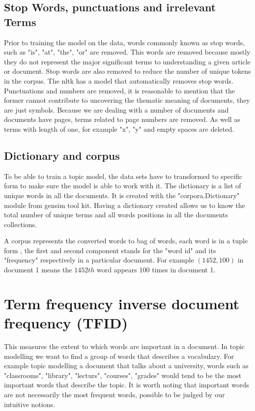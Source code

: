 \subsection{Stop Words, punctuations  and irrelevant Terms}
\begin{flushleft}
Prior to training the model on the data, words commonly known as stop words, such as "is", "at", "the", "or" are removed. This words are removed because mostly they do not represent the major significant terms to understanding a given article or document. Stop words are also removed to reduce the number of unique tokens in the corpus. The nltk has a model that automatically removes stop words. Punctuations and numbers are removed, it is reasonable to mention that the former cannot contribute to uncovering the  thematic meaning of documents, they are just symbols. Because we are dealing with a number of documents and documents have pages, terms related to page numbers are removed. As well as terms with  length of one, for example "x", "y" and empty spaces are deleted. 

\end{flushleft}
\subsection{Dictionary and corpus}
\begin{flushleft}
To be able to train a topic model, the data sets have to transformed to specific form to make sure the model is able to work with it. The dictionary is a list of unique words in all the documents. It is created with the "corpora.Dictionary" module from gensim tool kit. Having a dictionary created allows us to know the total number of unique terms and all words positions in all the documents collections.
\end{flushleft}
A corpus represents the converted words to bag of words, each word is in a tuple form , the first and second component stands for the  "word id" and its  "frequency" respectively in a particular document. For example $(1452,100)$ in document 1 means the $1452th$ word appears 100 times in document 1.
\section{Term frequency inverse document frequency (TFID)}
\begin{flushleft}
This measures the extent to which words are important in a document. In topic modelling we want to find a group of words that describes a vocabulary. For example topic modelling a document that talks about a university, words such as "classrooms", "library", "lecturs", "courses", "grades" would tend to be the most important words that describe the topic. It is worth noting that important words are not necessarily the most frequent words, possible to be judged by our intuitive notions. 
\end{flushleft}


